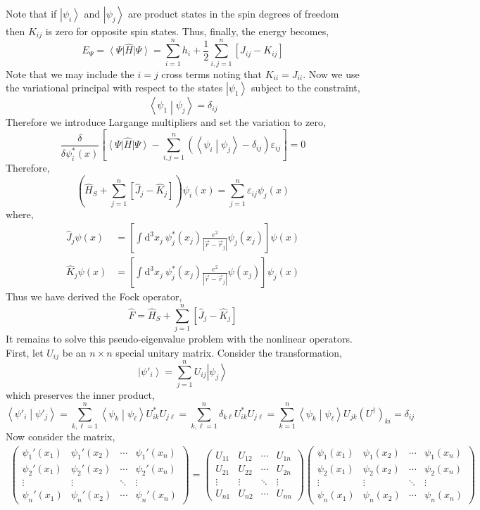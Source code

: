 \documentclass[12pt]{extarticle}
\newcommand{\dn}[2]{ \mathrm{d}^{#1} #2 \:}
\theoremstyle{definition}
\renewcommand{\H}{\hat{H}}
\newcommand{\inner}[2]{\left< #1 \middle| #2 \right>}
\newcommand{\ket}[1]{\left| #1 \right>}
\newcommand{\bra}[1]{\left< #1 \right|}
\begin{document}
Note that if $\ket{\psi_i}$ and $\ket{\psi_j}$ are product states in the spin degrees of freedom then $K_{ij}$ is zero for opposite spin states. Thus, finally, the energy becomes,
\[ E_\Psi =  \bra{\Psi} \H \ket{\Psi} = \sum_{i = 1}^n h_i + \frac{1}{2} \sum_{i,j = 1}^n [J_{ij} - K_{ij}] \]
Note that we may include the $i = j$ cross terms noting that $K_{ii} = J_{ii}$. 
Now we use the variational principal with respect to the states $\ket{\psi_1}$ subject to the constraint,
\[ \inner{\psi_1}{\psi_j} = \delta_{ij} \]
Therefore we introduce Largange multipliers and set the variation to zero,
\[ \frac{\delta}{\delta \psi_i^*(x)} \left[ \bra{\Psi} \H \ket{\Psi} - \sum_{i,j = 1}^n (\inner{\psi_i}{\psi_j} - \delta_{ij} ) \varepsilon_{ij} \right]  = 0 \]
Therefore, 
\[ \left( \H_S + \sum_{j = 1}^n [\hat{J}_j - \hat{K}_j] \right) \psi_i(x) = \sum_{j = 1}^n \varepsilon_{ij} \psi_j(x) \]
where,
\begin{align*}
\hat{J}_j \psi(x) & = \left[ \int \dn{3}{x_j} \psi_j^*(x_j) \frac{e^2}{|\vec{r} - \vec{r}_j |} \psi_j(x_j) \right] \psi(x)
\\
\hat{K}_j \psi(x) & = \left[ \int \dn{3}{x_j} \psi_j^*(x_j) \frac{e^2}{|\vec{r} - \vec{r}_j |} \psi(x_j) \right] \psi_j(x)
\end{align*}
Thus we have derived the Fock operator,
\[ \hat{F} = \H_S + \sum_{j = 1}^n [ \hat{J}_j - \hat{K}_j] \]
It remains to solve this pseudo-eigenvalue problem with the nonlinear operators. First, let $U_{ij}$ be an $n \times n$ special unitary matrix. Consider the transformation,
\[ \ket{\psi'_i} = \sum_{j = 1}^n U_{ij} \ket{\psi_j} \]
which preserves the inner product,
\[ \inner{\psi'_i}{\psi'_j} = \sum_{k,\ell = 1}^n \inner{\psi_k}{\psi_\ell} U_{ik}^* U_{j \ell} = \sum_{k,\ell = 1}^n \delta_{k \ell} U_{ik}^* U_{j \ell} = \sum_{k = 1}^n \inner{\psi_k}{\psi_\ell} U_{jk} (U^\dagger)_{ki} = \delta_{ij} \]
Now consider the matrix,
\begin{align*}
\begin{pmatrix}
\psi_1'(x_1) & \psi_1'(x_2) & \cdots & \psi_1'(x_n)
\\
\psi_2'(x_1) & \psi_2'(x_2) & \cdots & \psi_2'(x_n)
\\
\vdots & \vdots & \ddots & \vdots
\\
\psi_n'(x_1) & \psi_n'(x_2) & \cdots & \psi_n'(x_n)
\end{pmatrix}
= 
\begin{pmatrix}
U_{11} & U_{12} & \cdots & U_{1n}
\\
U_{21} & U_{22} & \cdots & U_{2n}
\\
\vdots & \vdots & \ddots & \vdots
\\
U_{n1} & U_{n2} & \cdots & U_{nn}
\end{pmatrix}
\begin{pmatrix}
\psi_1(x_1) & \psi_1 (x_2) & \cdots & \psi_1(x_n)
\\
\psi_2(x_1) & \psi_2 (x_2) & \cdots & \psi_2(x_n)
\\
\vdots & \vdots & \ddots & \vdots
\\
\psi_n(x_1) & \psi_n (x_2) & \cdots & \psi_n(x_n)
\end{pmatrix}
\end{align*}
\end{document}
